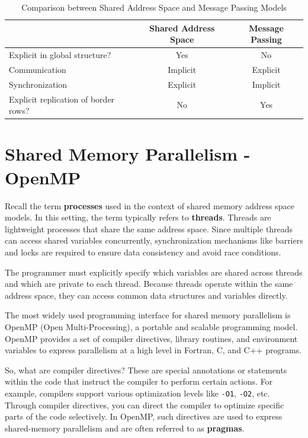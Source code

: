 \documentclass[12pt]{book}
\begin{document}
\begin{table}[H]
    \centering
    \begin{tabular}{|p{}|c|c|}
        \hline
        & \textbf{Shared Address Space} & \textbf{Message Passing} \\
        \hline
        Explicit in global structure? & Yes & No \\
        Communication                 & Implicit & Explicit \\
        Synchronization               & Explicit & Implicit \\
        Explicit replication of border rows? & No & Yes \\
        \hline
    \end{tabular}
    \caption{Comparison between Shared Address Space and Message Passing Models}
    \label{tab:finsummary}
\end{table}


\chapter{Shared Memory Parallelism - OpenMP}

Recall the term \textbf{processes} used in the context of shared memory address space models. In this setting, the term typically refers to \textbf{threads}. Threads are lightweight processes that share the same address space. Since multiple threads can access shared variables concurrently, synchronization mechanisms like barriers and locks are required to ensure data consistency and avoid race conditions.

The programmer must explicitly specify which variables are shared across threads and which are private to each thread. Because threads operate within the same address space, they can access common data structures and variables directly.

The most widely used programming interface for shared memory parallelism is OpenMP (Open Multi-Processing), a portable and scalable programming model. OpenMP provides a set of compiler directives, library routines, and environment variables to express parallelism at a high level in Fortran, C, and C++ programs.

So, what are compiler directives? These are special annotations or statements within the code that instruct the compiler to perform certain actions. For example, compilers support various optimization levels like \texttt{-O1}, \texttt{-O2}, etc. Through compiler directives, you can direct the compiler to optimize specific parts of the code selectively. In OpenMP, such directives are used to express shared-memory parallelism and are often referred to as \textbf{pragmas}.
\end{document}
